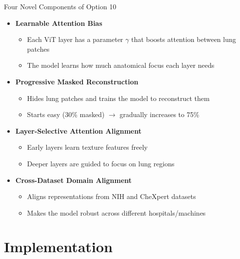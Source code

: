 \documentclass{beamer}
\begin{document}
\begin{frame}{Four Novel Components of Option 10}
\begin{itemize}
    \item[\textbf{1.}] \textbf{Learnable Attention Bias}
    \begin{itemize}
        \item Each ViT layer has a parameter $\gamma$ that boosts attention between lung patches
        \item The model learns how much anatomical focus each layer needs
    \end{itemize}
    \vspace{6pt}
    \item[\textbf{2.}] \textbf{Progressive Masked Reconstruction}
    \begin{itemize}
        \item Hides lung patches and trains the model to reconstruct them
        \item Starts easy (30\% masked) $\rightarrow$ gradually increases to 75\%
    \end{itemize}
    \vspace{6pt}
    \item[\textbf{3.}] \textbf{Layer-Selective Attention Alignment}
    \begin{itemize}
        \item Early layers learn texture features freely
        \item Deeper layers are guided to focus on lung regions
    \end{itemize}
    \vspace{6pt}
    \item[\textbf{4.}] \textbf{Cross-Dataset Domain Alignment}
    \begin{itemize}
        \item Aligns representations from NIH and CheXpert datasets
        \item Makes the model robust across different hospitals/machines
    \end{itemize}
\end{itemize}
\end{frame}


\section{Implementation}
\end{document}
